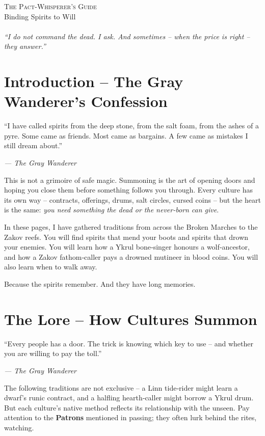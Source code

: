 \documentclass[10pt,a5paper]{book}
\begin{document}
\frontmatter
\thispagestyle{empty}
\vspace*{2cm}
\begin{center}
{\Huge\scshape The Pact-Whisperer’s Guide}\\[0.5cm]
{\Large Binding Spirits to Will}\\[1cm]
\\[1cm]
{\itshape “I do not command the dead. I ask. And sometimes – when the price is right – they answer.”}
\end{center}
\vfill
\clearpage

\tableofcontents
\clearpage

\mainmatter

\chapter{Introduction – The Gray Wanderer’s Confession}
\epigraph{“I have called spirits from the deep stone, from the salt foam, from the ashes of a pyre. Some came as friends. Most came as bargains. A few came as mistakes I still dream about.”}{\textit{— The Gray Wanderer}}

This is not a grimoire of safe magic. Summoning is the art of opening doors and hoping you close them before something follows you through. Every culture has its own way – contracts, offerings, drums, salt circles, cursed coins – but the heart is the same: \textit{you need something the dead or the never‑born can give}.

In these pages, I have gathered traditions from across the Broken Marches to the Zakov reefs. You will find spirits that mend your boots and spirits that drown your enemies. You will learn how a Ykrul bone‑singer honours a wolf‑ancestor, and how a Zakov fathom‑caller pays a drowned mutineer in blood coins. You will also learn when to walk away.

Because the spirits remember. And they have long memories.

\clearpage

\chapter{The Lore – How Cultures Summon}
\epigraph{“Every people has a door. The trick is knowing which key to use – and whether you are willing to pay the toll.”}{\textit{— The Gray Wanderer}}

The following traditions are not exclusive – a Linn tide‑rider might learn a dwarf’s runic contract, and a halfling hearth‑caller might borrow a Ykrul drum. But each culture’s native method reflects its relationship with the unseen. Pay attention to the \textbf{Patrons} mentioned in passing; they often lurk behind the rites, watching.
\end{document}
